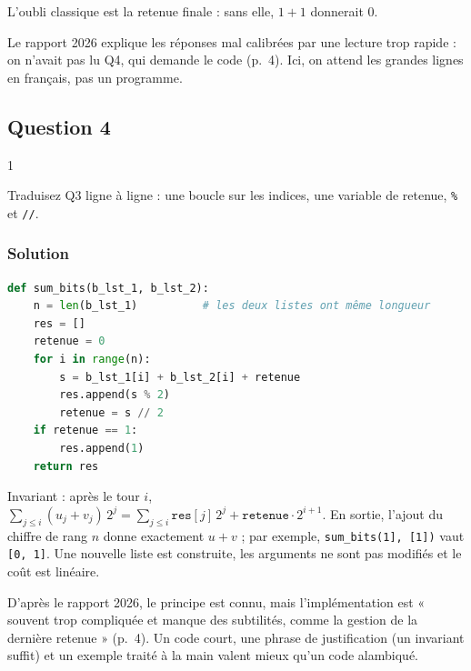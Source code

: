 \documentclass[11pt,a4paper]{article}
\begin{document}
\begin{piege}

L'oubli classique est la retenue finale : sans elle, \(1 + 1\) donnerait \(0\).

\end{piege}

\begin{jury}

Le rapport 2026 explique les réponses mal calibrées par une lecture trop rapide : on n'avait pas lu Q4, qui demande le code (p.~4). Ici, on attend les grandes lignes en français, pas un programme.

\end{jury}

\hypertarget{question-4}{%
\subsection{Question 4}\label{question-4}}

\begin{indication}{1}

Traduisez Q3 ligne à ligne : une boucle sur les indices, une variable de retenue, \texttt{\%} et \texttt{//}.

\end{indication}

\hypertarget{solution-3}{%
\subsubsection{Solution}\label{solution-3}}

\begin{lstlisting}[language=Python]
def sum_bits(b_lst_1, b_lst_2):
    n = len(b_lst_1)          # les deux listes ont même longueur
    res = []
    retenue = 0
    for i in range(n):
        s = b_lst_1[i] + b_lst_2[i] + retenue
        res.append(s % 2)
        retenue = s // 2
    if retenue == 1:
        res.append(1)
    return res
\end{lstlisting}

Invariant : après le tour \(i\), \(\sum_{j \le i} (u_j + v_j)\,2^j = \sum_{j \le i} \texttt{res}[j]\,2^j + \texttt{retenue}\cdot 2^{i+1}\). En sortie, l'ajout du chiffre de rang \(n\) donne exactement \(u + v\) ; par exemple, \texttt{sum\_bits(\allowbreak{}{[}1{]}\allowbreak{},\allowbreak{}\ {[}1{]}\allowbreak{})\allowbreak{}} vaut \texttt{{[}0,\ 1{]}}. Une nouvelle liste est construite, les arguments ne sont pas modifiés et le coût est linéaire.

\begin{jury}

D'après le rapport 2026, le principe est connu, mais l'implémentation est « souvent trop compliquée et manque des subtilités, comme la gestion de la dernière retenue » (p.~4). Un code court, une phrase de justification (un invariant suffit) et un exemple traité à la main valent mieux qu'un code alambiqué.

\end{jury}
\end{document}
